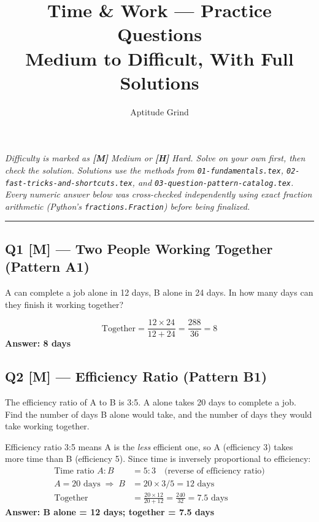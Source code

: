 \documentclass[11pt]{article}
\title{\color{primary}\textbf{Time \& Work --- Practice Questions}\\[4pt]\large Medium to Difficult, With Full Solutions}
\author{Aptitude Grind}
\date{}
\begin{document}
\maketitle
\thispagestyle{fancy}

\noindent\textit{Difficulty is marked as \textbf{[M]} Medium or \textbf{[H]} Hard. Solve on your own
first, then check the solution. Solutions use the methods from \texttt{01-fundamentals.tex},
\texttt{02-fast-tricks-and-shortcuts.tex}, and \texttt{03-question-pattern-catalog.tex}. Every
numeric answer below was cross-checked independently using exact fraction arithmetic (Python's
\texttt{fractions.Fraction}) before being finalized.}

\bigskip
\hrule
\bigskip

\subsection*{Q1 [M] --- Two People Working Together (Pattern A1)}
A can complete a job alone in 12 days, B alone in 24 days. In how many days can they finish it
working together?

\begin{tipbox}[Solution]
\[
\text{Together} = \frac{12 \times 24}{12+24} = \frac{288}{36} = 8
\]
\textbf{Answer: 8 days}
\end{tipbox}

\subsection*{Q2 [M] --- Efficiency Ratio (Pattern B1)}
The efficiency ratio of A to B is 3:5. A alone takes 20 days to complete a job. Find the number of
days B alone would take, and the number of days they would take working together.

\begin{tipbox}[Solution]
Efficiency ratio 3:5 means A is the \emph{less} efficient one, so A (efficiency 3) takes more time
than B (efficiency 5). Since time is inversely proportional to efficiency:
\begin{align*}
\text{Time ratio } A:B &= 5:3 \quad \text{(reverse of efficiency ratio)} \\
A = 20 \text{ days} \;\Rightarrow\; B &= 20 \times 3/5 = 12 \text{ days} \\
\text{Together} &= \frac{20 \times 12}{20+12} = \frac{240}{32} = 7.5 \text{ days}
\end{align*}
\textbf{Answer: B alone = 12 days; together = 7.5 days}
\end{tipbox}
\end{document}
